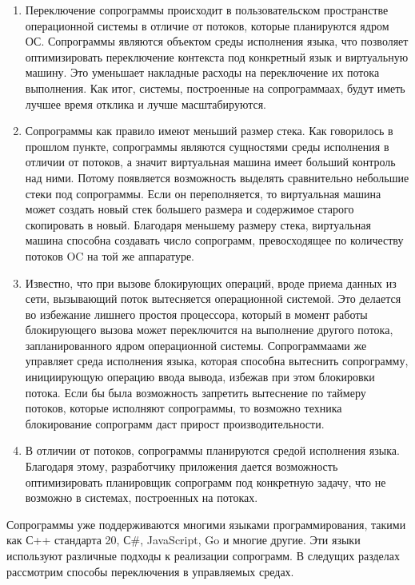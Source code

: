	\begin{enumerate}
		\item Переключение сопрограммы происходит в пользовательском пространстве операционной системы в отличие от
		потоков, которые планируются ядром ОС. Сопрограммы являются объектом среды исполнения языка, что
		позволяет оптимизировать переключение контекста под конкретный язык и виртуальную машину. Это уменьшает
		накладные расходы на переключение их потока выполнения. Как итог, системы, построенные на сопрограммаах, будут
		иметь лучшее время отклика и лучше масштабируются.
		\item Сопрограммы как правило имеют меньший размер стека. Как говорилось в прошлом пункте,
		сопрограммы являются сущностями среды исполнения в отличии от потоков, а значит виртуальная машина имеет больший
		контроль над ними. Потому появляется возможность выделять сравнительно небольшие стеки под сопрограммы. 
		Если он переполняется, то виртуальная машина может создать новый стек большего размера и содержимое старого
		скопировать в новый. Благодаря меньшему размеру стека, виртуальная машина способна создавать число сопрограмм,
		превосходящее по количеству потоков OC на той же аппаратуре.
		\item Известно, что при вызове блокирующих операций, вроде приема данных из сети, вызывающий поток вытесняется
		операционной системой\cite{linux-api}. Это делается во избежание лишнего простоя процессора, который в момент
		работы блокирующего вызова может переключится на выполнение другого потока, запланированного ядром операционной
		системы. Сопрограммаами же управляет среда исполнения языка, которая способна вытеснить сопрограмму,
		инициирующую операцию ввода вывода, избежав при	этом блокировки потока. Если бы была возможность запретить
		вытеснение по таймеру потоков, которые исполняют сопрограммы, то возможно техника блокирование сопрограмм даст
		прирост производительности.
		\item В отличии от потоков, сопрограммы планируются средой исполнения языка. Благодаря этому, разработчику
		приложения дается возможность оптимизировать планировщик сопрограмм	под конкретную задачу, что не возможно в
		системах, построенных на потоках.
	\end{enumerate}
	Сопрограммы уже поддерживаются многими языками программирования, такими как С++ стандарта 20, С\#, JavaScript,
	Go и многие другие. Эти языки используют различные подходы к реализации сопрограмм. В следущих разделах 
	рассмотрим способы переключения в управляемых средах.
	

